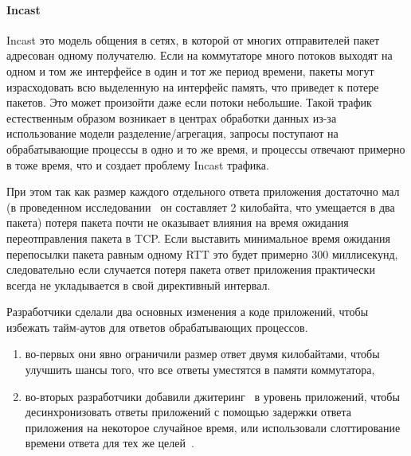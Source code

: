 \documentclass[14pt, a4paper,oneside]{extarticle}
\begin{document}
\paragraph{Incast}

Incast это модель общения в сетях, в которой от многих отправителей пакет адресован одному получателю. Если на коммутаторе много потоков выходят на одном и том же интерфейсе в один и тот же период времени, пакеты могут израсходовать всю выделенную на интерфейс память, что приведет к потере пакетов. Это может произойти даже если потоки небольшие. Такой трафик естественным образом возникает в центрах обработки данных из-за использование модели разделение/агрегация, запросы поступают на обрабатывающие процессы в одно и то же время, и процессы отвечают примерно в тоже время, что и создает проблему Incast трафика.

При этом так как размер каждого отдельного ответа приложения достаточно мал (в проведенном исследовании~\cite{dctcp} он составляет 2 килобайта, что умещается в два пакета) потеря пакета почти не оказывает влияния на время ожидания переотправления пакета в TCP. Если выставить минимальное время ожидания перепосылки пакета равным одному RTT это будет примерно 300 миллисекунд, следовательно если случается потеря пакета ответ приложения практически всегда не укладывается в свой директивный интервал.

Разработчики сделали два основных изменения а коде приложений, чтобы избежать тайм-аутов для ответов обрабатывающих процессов.
\begin{enumerate}
\item во-первых они явно ограничили размер ответ двумя килобайтами, чтобы улучшить шансы того, что все ответы уместятся в памяти коммутатора,
\item во-вторых разработчики добавили джитеринг~\cite{jittering} в уровень приложений, чтобы десинхронизовать ответы приложений с помощью задержки ответа приложения на некоторое случайное время, или использовали слоттирование времени ответа для тех же целей~\cite{ictcp}.
\end{enumerate}
\end{document}
